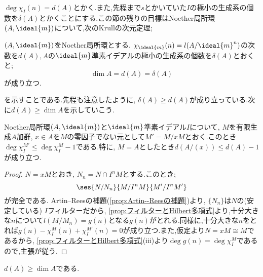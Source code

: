 $\deg\chi_I(n)=d(A)$とかく.また,先程まで$s$とかいていた$I$の極小の生成系の個数を$\delta(A)$とかくことにする.この節の残りの目標はNoether局所環$(A,\ideal{m})$について,次のKrullの次元定理;
\begin{thm}[Krullの次元定理]\label{thm:Krullの次元定理}
	$(A,\ideal{m})$をNoether局所環とする. $\chi_{\ideal{m}}(n)=l(A/\ideal{m}^n)$の次数を$d(A),A$の$\ideal{m}$準素イデアルの極小の生成系の個数を$\delta(A)$とおくと;
	\[\dim A=d(A)=\delta(A)\]
	が成り立つ.
\end{thm}

を示すことである.先程も注意したように, $\delta(A)\geq d(A)$が成り立っている.次に$d(A)\geq\dim A$を示していこう.

\begin{lem}\label{lem:商の特性多項式を上から抑える}
	Noether局所環$(A,\ideal{m})$と$\ideal{m}$準素イデアル$I$について, $M$を有限生成$A$加群, $x\in A$を$M$の零因子でない元として$M'=M/xM$とおく.このとき$\deg\chi_I^{M'}\leq\deg\chi_I^M-1$である.特に, $M=A$としたとき$d(A/(x))\leq d(A)-1$が成り立つ.
\end{lem}

\begin{proof}
	$N=xM$とおき, $N_n=N\cap I^nM$とする.このとき;
	\[\ses{N/N_n}{M/I^nM}{M'/I^nM'}\]
	が完全である. Artin--Reesの補題(\ref{prop:Artin--Reesの補題})より, $\{N_n\}$は$N$の(安定している) $I$フィルターだから, \ref{prop:フィルターとHilbert多項式}より,十分大きな$n$について$l(M/M_n)=g(n)$となる$g(n)$がとれる.同様に,十分大きな$n$をとれば$g(n)-\chi_I^M(n)+\chi_I^{M'}(n)=0$が成り立つ.また,仮定より$N=xM\cong M$であるから, \ref{prop:フィルターとHilbert多項式}(iii)より$\deg g(n)=\deg\chi_I^M$であるので,主張が従う.
\end{proof}

\begin{prop}\label{prop:d(A)geq dim A}
	$d(A)\geq\dim A$である.
\end{prop}

